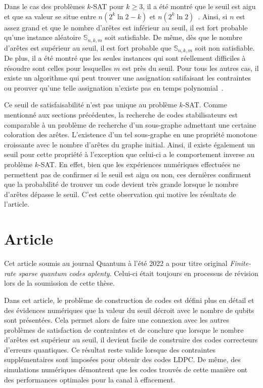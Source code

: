 Dans le cas des problèmes $k$-SAT pour $k \geq 3$,
il a été montré que le seuil est aigu et que sa valeur se
situe entre $n(2^k \ln 2 - k)$ et $n(2^k \ln 2)$~\cite{achlioptas_rigorous_2005}.
Ainsi, si $n$ est assez grand et que le nombre d'arêtes est inférieur au seuil,
il est fort probable qu'une instance aléatoire $\mathbb S_{n,k,m}$ soit satisfiable.
De même,
dès que le nombre d'arêtes est supérieur au seuil,
il est fort probable que $\mathbb S_{n, k, m}$ soit non satisfiable.
De plus, il a été montré que les seules instances qui sont réellement difficiles
à résoudre sont celles pour lesquelles $m$ est près du seuil.
Pour tous les autres cas,
il existe un algorithme qui peut trouver une assignation satifaisant les contraintes
ou prouver qu'une telle assignation n'existe pas en temps polynomial~\cite{cheeseman_where_1991}.

Ce seuil de satisfaisabilité n'est pas unique au problème $k$-SAT.
Comme mentionné aux sections précédentes,
la recherche de codes stabilisateurs est comparable à un problème de recherche d'un sous-graphe
admettant une certaine coloration des arêtes.
L'existence d'un tel sous-graphe
en une propriété monotone croissante avec le nombre d'arêtes du graphe initial.
Ainsi,
il existe également un seuil pour cette propriété à l'exception que celui-ci a le comportement 
inverse au problème $k$-SAT.
En effet,
bien que les expériences numériques effectuées ne permettent pas de confirmer si le seuil 
est aigu ou non,
ces dernières confirment que la probabilité de trouver un code devient
très grande lorsque le nombre d'arêtes dépasse le seuil.
C'est cette observation qui motive les résultats de l'article.

\section{Article}

Cet article soumis au journal Quantum à l'été 2022 a pour titre original
\textit{Finite-rate sparse quantum codes aplenty}.
Celui-ci était toujours en processus de révision lors de la soumission de cette thèse.

Dans cet article, le problème de construction de codes est défini plus en détail
et des évidences numériques que la valeur du seuil décroit avec le nombre de qubits sont présentées.
Cela permet alors de faire une connexion avec les autres problèmes de satisfaction de contraintes
et de conclure que lorsque le nombre d'arêtes est supérieur au seuil,
il devient facile de construire des codes correcteurs d'erreurs quantiques.
Ce résultat reste valide lorsque des contraintes supplémentaires sont imposées pour obtenir des codes LDPC.
De même,
des simulations numériques démontrent que les codes trouvés de cette manière
ont des performances optimales pour la canal à effacement.

